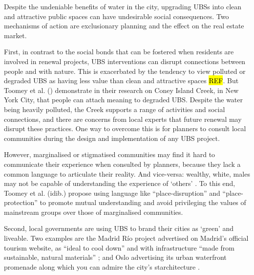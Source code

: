 \documentclass{article}
\begin{document}
Despite the undeniable benefits of water in the city, upgrading UBSs into clean and attractive public spaces can have undesirable social consequences.
Two mechanisms of action are exclusionary planning and the effect on the real estate market.

First, in contrast to the social bonds that can be fostered when residents are involved in renewal projects, UBS interventions can disrupt connections between people and with nature.
This is exacerbated by the tendency to view polluted or degraded UBS as having less value than clean and attractive spaces \hl{REF}. 
But Toomey et al. (\citeyear{toomey2021place}) demonstrate in their research on Coney Island Creek, in New York City, that people can attach meaning to degraded UBS. Despite the water being heavily polluted, the Creek supports a range of activities and social connections, and there are concerns from local experts that future renewal may disrupt these practices. One way to overcome this is for planners to consult local communities during the design and implementation of any UBS project.

However, marginalised or stigmatised communities may find it hard to communicate their experience when consulted by planners, because they lack a common language to articulate their reality. And vice-versa: wealthy, white, males may not be capable of understanding the experience of `others' \parencite{anguelovski2020expanding}. To this end, Toomey et al. (idib.) propose using language like ``place-disruption'' and ``place-protection'' to promote mutual understanding and avoid privileging the values of mainstream groups over those of marginalised communities.

Second, local governments are using UBS to brand their cities as `green' and liveable. Two examples are the Madrid Río project advertised on Madrid's official tourism website, as ``ideal to cool down'' and with infrastructure ``made from sustainable, natural materials'' \parencite{madridrio}; and Oslo advertising its urban waterfront promenade along which you can admire the city's starchitecture \parencite{visitoslo}.
\end{document}
